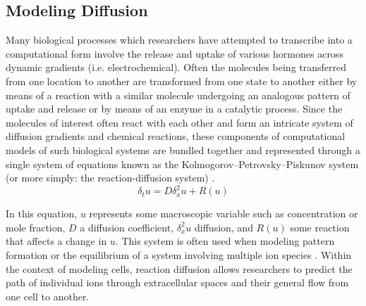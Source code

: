 \subsection{Modeling Diffusion}
Many biological processes which researchers have attempted to transcribe into a computational form involve the release and uptake of various hormones across dynamic gradients (i.e. electrochemical). Often the molecules being transferred from one location to another are transformed from one state to another either by means of a reaction with a similar molecule undergoing an analogous pattern of uptake and release or by means of an enzyme in a catalytic process. Since the molecules of interest often react with each other and form an intricate system of diffusion gradients and chemical reactions, these components of computational models of such biological systems are bundled together and represented through a single system of equations known as the Kolmogorov–Petrovsky–Piskunov system (or more simply: the reaction-diffusion system) \cite{fisher_wave_1937}.
\begin{equation}\label{rxd}
\delta_t u = D \delta_x^2 u+R(u)
\end{equation}
\par In this equation, $u$ represents some macroscopic variable such as concentration or mole fraction, $D$ a diffusion coefficient, $\delta_x^2 u$ diffusion, and $R(u)$ some reaction that affects a change in $u$. This system is often used when modeling pattern formation or the equilibrium of a system involving multiple ion species \cite{kondo_reaction-diffusion_2010}. Within the context of modeling cells, reaction diffusion allows researchers to predict the path of individual ions through extracellular spaces and their general flow from one cell to another.

